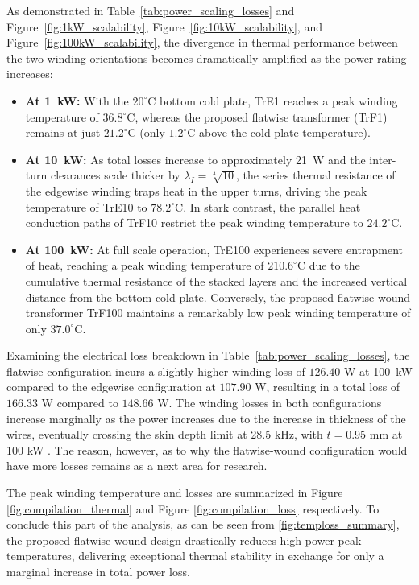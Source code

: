 As demonstrated in Table~\ref{tab:power_scaling_losses} and Figure~\ref{fig:1kW_scalability}, Figure~\ref{fig:10kW_scalability}, and Figure~\ref{fig:100kW_scalability}, the divergence in thermal performance between the two winding orientations becomes dramatically amplified as the power rating increases:
\begin{itemize}
    \item \textbf{At 1~kW:} With the $20^\circ\text{C}$ bottom cold plate, TrE1 reaches a peak winding temperature of $36.8^\circ\text{C}$, whereas the proposed flatwise transformer (TrF1) remains at just $21.2^\circ\text{C}$ (only $1.2^\circ\text{C}$ above the cold-plate temperature).
    \item \textbf{At 10~kW:} As total losses increase to approximately 21~W and the inter-turn clearances scale thicker by $\lambda_I = \sqrt[4]{10}$, the series thermal resistance of the edgewise winding traps heat in the upper turns, driving the peak temperature of TrE10 to $78.2^\circ\text{C}$. In stark contrast, the parallel heat conduction paths of TrF10 restrict the peak winding temperature to $24.2^\circ\text{C}$.
    \item \textbf{At 100~kW:} At full scale operation, TrE100 experiences severe entrapment of heat, reaching a peak winding temperature of $210.6^\circ\text{C}$ due to the cumulative thermal resistance of the stacked layers and the increased vertical distance from the bottom cold plate. Conversely, the proposed flatwise-wound transformer TrF100 maintains a remarkably low peak winding temperature of only $37.0^\circ\text{C}$.
\end{itemize}

Examining the electrical loss breakdown in Table~\ref{tab:power_scaling_losses}, the flatwise configuration incurs a slightly higher winding loss of $126.40\text{ W}$ at 100~kW compared to the edgewise configuration at $107.90\text{ W}$, resulting in a total loss of $166.33\text{ W}$ compared to $148.66\text{ W}$. The winding losses in both configurations increase marginally as the power increases due to the increase in thickness of the wires, eventually crossing the skin depth limit at 28.5 kHz, with $t = 0.95$ mm at 100 kW . The reason, however, as to why the flatwise-wound configuration would have more losses remains as a next area for research. 

The peak winding temperature and losses are summarized in Figure \ref{fig:compilation_thermal} and Figure \ref{fig:compilation_loss} respectively. To conclude this part of the analysis, as can be seen from \ref{fig:temploss_summary}, the proposed flatwise-wound design drastically reduces high-power peak temperatures, delivering exceptional thermal stability in exchange for only a marginal increase in total power loss. 

